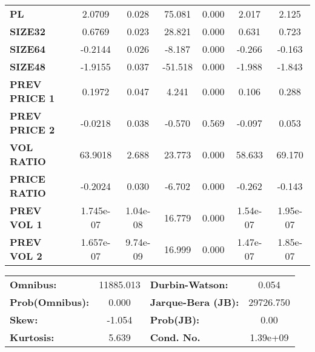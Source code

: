 \begin{center}
\begin{tabular}{lcccccc}
\textbf{PL}    &       2.0709  &        0.028     &    75.081  &         0.000        &        2.017    &        2.125     \\
\textbf{SIZE32}    &       0.6769  &        0.023     &    28.821  &         0.000        &        0.631    &        0.723     \\
\textbf{SIZE64}    &      -0.2144  &        0.026     &    -8.187  &         0.000        &       -0.266    &       -0.163     \\
\textbf{SIZE48}   &      -1.9155  &        0.037     &   -51.518  &         0.000        &       -1.988    &       -1.843     \\
\textbf{PREV PRICE 1}   &       0.1972  &        0.047     &     4.241  &         0.000        &        0.106    &        0.288     \\
\textbf{PREV PRICE 2}   &      -0.0218  &        0.038     &    -0.570  &         0.569        &       -0.097    &        0.053     \\
\textbf{VOL RATIO}   &      63.9018  &        2.688     &    23.773  &         0.000        &       58.633    &       69.170     \\
\textbf{PRICE RATIO}   &      -0.2024  &        0.030     &    -6.702  &         0.000        &       -0.262    &       -0.143     \\
\textbf{PREV VOL 1}   &    1.745e-07  &     1.04e-08     &    16.779  &         0.000        &     1.54e-07    &     1.95e-07     \\
\textbf{PREV VOL 2}   &    1.657e-07  &     9.74e-09     &    16.999  &         0.000        &     1.47e-07    &     1.85e-07     \\
\bottomrule
\end{tabular}
\begin{tabular}{lclc}
\textbf{Omnibus:}       & 11885.013 & \textbf{  Durbin-Watson:     } &     0.054  \\
\textbf{Prob(Omnibus):} &    0.000  & \textbf{  Jarque-Bera (JB):  } & 29726.750  \\
\textbf{Skew:}          &   -1.054  & \textbf{  Prob(JB):          } &      0.00  \\
\textbf{Kurtosis:}      &    5.639  & \textbf{  Cond. No.          } &  1.39e+09  \\
\bottomrule
\end{tabular}
\end{center}